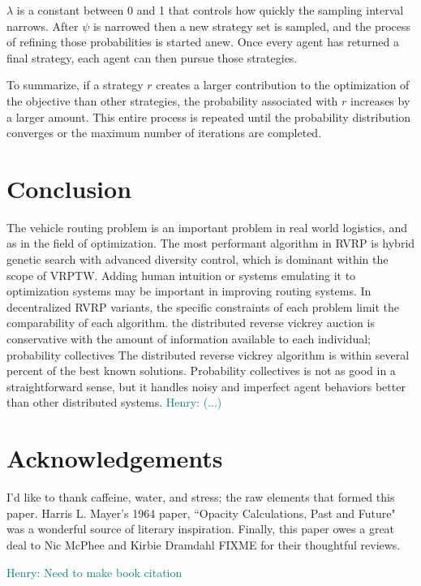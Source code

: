 \documentclass{sig-alternate}
\newcommand{\allcomments}[1]{{#1}}
\newcommand{\hfcomment}[1]{\textcolor{Teal}{\allcomments{Henry: {#1}}}}
\begin{document}
$\lambda$ is a constant between 0 and 1 that controls how quickly the sampling interval narrows. After $\psi$ is narrowed then a new strategy set is sampled, and the process of refining those probabilities is started anew. Once every agent has returned a final strategy, each agent can then pursue those strategies.

To summarize, if a strategy $r$ creates a larger contribution to the optimization of the objective than other strategies, the probability associated with $r$ increases by a larger amount. This entire process is repeated until the probability distribution converges or the maximum number of iterations are completed. 


\section{Conclusion}
\label{conclusion}
The vehicle routing problem is an important problem in real world logistics, and as in the field of optimization. The most performant algorithm in RVRP is hybrid genetic search with advanced diversity control, which is dominant within the scope of VRPTW. Adding human intuition or systems emulating it to optimization systems may be important in improving routing systems. In decentralized RVRP variants, the specific constraints of each problem limit the comparability of each algorithm. the distributed reverse vickrey auction is conservative with the amount of information available to each individual; probability collectives The distributed reverse vickrey algorithm is within several percent of the best known solutions. Probability collectives is not as good in a straightforward sense, but it handles noisy and imperfect agent behaviors better than other distributed systems. 
 \hfcomment{(...)}
\section{Acknowledgements}
I'd like to thank caffeine, water, and stress; the raw elements that formed this paper. Harris L. Mayer's 1964 paper, ``Opacity Calculations, Past and Future" was a wonderful source of literary inspiration. Finally, this paper owes a great deal to Nic McPhee and Kirbie Dramdahl FIXME for their thoughtful reviews.

  


\hfcomment{Need to make book citation}
\end{document}
